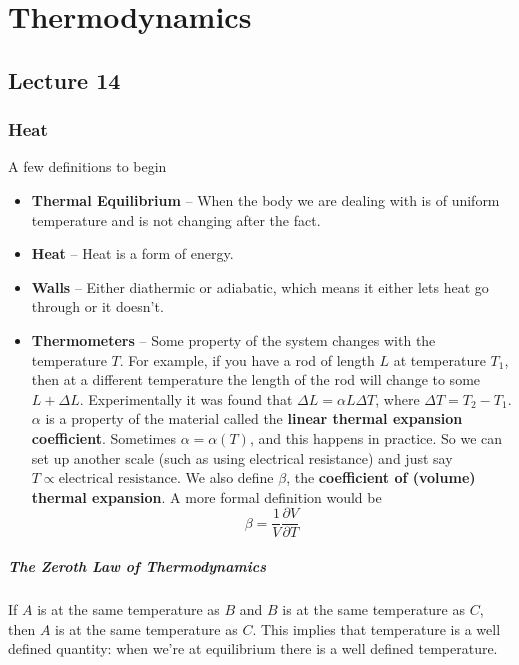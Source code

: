 \documentclass{report}
\numberwithin{equation}{section}
\newcommand{\pd}[2]{\frac{\partial #1}{\partial #2}}
\begin{document}
\chapter{Thermodynamics}
\section{Lecture 14}
\subsection{Heat}
A few definitions to begin
\begin{itemize}
    \item \textbf{Thermal Equilibrium} -- When the body we are dealing with is of uniform temperature and is not changing after the fact.
    \item \textbf{Heat} -- Heat is a form of energy.
    \item \textbf{Walls} -- Either diathermic or adiabatic, which means it either lets heat go through or it doesn't.
    \item \textbf{Thermometers} -- Some property of the system changes with the temperature $T$. For example, if you have a rod of length
    $L$ at temperature $T_1$, then at a different temperature the length of the rod will change to some $L +\Delta L$. Experimentally
    it was found that $\Delta L = \alpha L\Delta T$, where $\Delta T = T_2 - T_1$. $\alpha$ is a property of the material called the
    \textbf{linear thermal expansion coefficient}. Sometimes $\alpha = \alpha(T)$, and this happens in practice. So we can set up another scale (such as using electrical resistance)
    and just say $T \propto \text{electrical resistance}$. We also define $\beta$, the
    \textbf{coefficient of (volume) thermal expansion}. A more formal definition would be
    \begin{equation}
        \beta = \frac{1}{V}\pd{V}{T}
    \end{equation}
\end{itemize}
\paragraph{The Zeroth Law of Thermodynamics} If $A$ is at the same temperature as $B$ and $B$ is at the same temperature as $C$,
then $A$ is at the same temperature as $C$. This implies that temperature is a well defined quantity: when we're at equilibrium there
is a well defined temperature.\\
\end{document}
